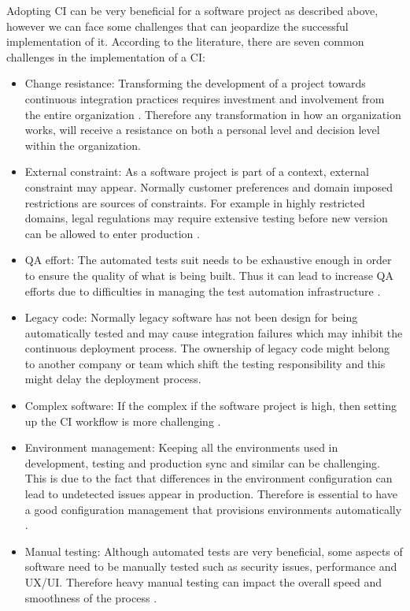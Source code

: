 Adopting CI can be very beneficial for a software project as described above, however we can face some challenges that can jeopardize the successful implementation of it. According to the literature, there are seven common challenges in the implementation of a CI:

\begin{itemize}
\item Change resistance: Transforming the development of a project towards continuous integration practices requires investment and involvement from the entire organization \citep{Rodriguez2016}. Therefore any transformation in how an organization works, will receive a resistance on both a personal level and decision level within the organization.
\item External constraint: As a software project is part of a context, external constraint may appear. Normally customer preferences and domain imposed restrictions are sources of constraints. For example in highly restricted domains, legal regulations may require extensive testing before new version can be allowed to enter production \citep{Rodriguez2016}.
\item QA effort: The automated tests suit needs to be exhaustive enough in order to ensure the quality of what is being built. Thus it can lead to increase QA efforts due to difficulties in managing the test automation infrastructure \citep{Rodriguez2016}.
\item Legacy code: Normally legacy software has not been design for being automatically tested and may cause integration failures which may inhibit the continuous deployment process. The ownership of legacy code might belong to another company or team which shift the testing responsibility and this might delay the deployment process.
\item Complex software: If the complex if the software project is high, then setting up the CI workflow is more challenging \citep{Leppanen2015}.
\item Environment management: Keeping all the environments used in development, testing and production sync and similar can be challenging. This is due to the fact that differences in the environment configuration can lead to undetected issues appear in production. Therefore is essential to have a good configuration management that provisions environments automatically \citep{Leppanen2015}.
\item Manual testing: Although automated tests are very beneficial, some aspects of software need to be manually tested such as security issues, performance and UX/UI. Therefore 	heavy manual testing can impact the overall speed and smoothness of the process \citep{Leppanen2015}.
\end{itemize}

